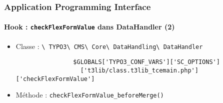 
\begin{frame}[fragile]
	\frametitle{Application Programming Interface}
	\framesubtitle{Hook : \texttt{checkFlexFormValue} dans DataHandler (2)}

	\begin{itemize}
		\item Classe :\newline
			\smaller
				\texttt{\textbackslash
					TYPO3\textbackslash
					CMS\textbackslash
					Core\textbackslash
					DataHandling\textbackslash
					DataHandler}\normalsize

			\lstset{
				basicstyle=\smaller\ttfamily
			}

			\begin{lstlisting}
				$GLOBALS['TYPO3_CONF_VARS']['SC_OPTIONS']
				  ['t3lib/class.t3lib_tcemain.php']['checkFlexFormValue']
			\end{lstlisting}

		\item Méthode :\newline
			\smaller
				\texttt{checkFlexFormValue\_beforeMerge()}

	\end{itemize}

\end{frame}


